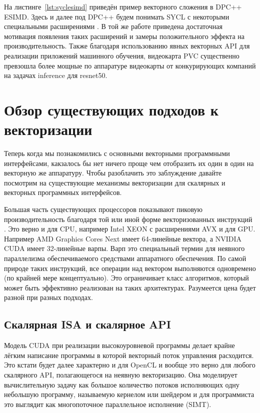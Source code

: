 На листинге~\cref{lst:syclesimd} приведён пример векторного сложения в DPC++ ESIMD. Здесь и далее под DPC++ будем понимать SYCL с некоторыми специальными расширениями \cite{reinders2021dpc}. В той же работе приведена достаточная мотивация появления таких расширений и замеры положительного эффекта на производительность. Также благодаря использованию явных векторных API для реализации приложений машинного обучения, видеокарта PVC \cite{gomes2022ponte} существенно превзошла более мощные по аппаратуре видеокарты от конкурирующих компаний на задачах inference для resnet50.

\section{Обзор существующих подходов к векторизации}\label{sec:overview/vectorizing}

Теперь когда мы познакомились с основными векторными программными интерфейсами, какзалось бы нет ничего проще чем отобразить их один в один на векторную же аппаратуру. Чтобы разоблачить это заблуждение давайте посмотрим на существующие механизмы векторизации для скалярных и векторных программных интерфейсов.

Большая часть существующих процессоров показывают пиковую производительность благодаря той или иной форме векторизованных инструкций \cite{bialas2015benchmarking}. Это верно и для CPU, например Intel XEON с расширениями AVX и для GPU. Например AMD Graphics Cores Next имеет 64-линейные вектора, а NVIDIA CUDA имеет 32-линейные варпы. Варп \cite{passerat2015warp} это специальный термин для неявного параллелизма обеспечиваемого средствами аппаратного обеспечения. По самой природе таких инструкций, все операции над вектором выполняются одновремено (по крайней мере концептуально). Это ограничивает класс алгоритмов, который может быть эффективно реализован на таких архитектурах. Разумеется цена будет разной при разных подходах.

\subsection{Скалярная ISA и скалярное API}\label{subsec:overview/vectorizing/cuda}

Модель CUDA при реализации высокоуровневой программы делает крайне лёгким написание программы в которой векторный поток управления расходится. Это кстати будет далее характерно и для OpenCL и вообще это верно для любого скалярного API, полагающегося на неявную векторизацию. Она моделирует вычислительную задачу как большое количество потоков исполняющих одну небольшую программу, называемую кернелом или шейдером и для программиста это выглядит как многопоточное параллельное исполнение (SIMT).

